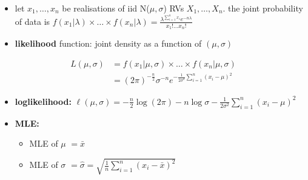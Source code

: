 \documentclass[10pt, landscape]{article}
\newcommand{\xbar}{\bar{x}}
\newcommand{\seq}[2][n]{#2_1, \dots, #2_{#1}}
\begin{document}
\begin{multicols*}{4}
  \begin{itemize}
    \item let $\seq{x}$ be realisations of iid N($\mu, \sigma$) RVs $\seq X$. 
      the joint probability of data is  $f(x_1 \vert \lambda) \times \dots \times f(x_n\vert \lambda) = \frac{\lambda^{\sum^n_{i=1} x_i} e^{-n\lambda}}{x_1! \dots x_n!}$
    \item \textbf{likelihood} function: joint density as a function of $(\mu, \sigma)$
  \end{itemize}
  \begin{align*}
    L(\mu, \sigma) &= f(x_1 \vert \mu,\sigma) \times \dots \times f(x_n \vert \mu, \sigma) \\
                   &= (2\pi)^{-\frac{n}{2}} \sigma^{-n} e^{-\frac{1}{2\sigma^2}\sum^n_{i=1}(x_i - \mu)^2}
  \end{align*}

  \begin{itemize}
    \item \textbf{loglikelihood:}
      $\ell(\mu,\sigma) = -\frac{n}{2} \log(2\pi) - n\log\sigma - \frac{1}{2\sigma^2} \sum^n_{i=1}(x_i - \mu)^2$
    \item \textbf{MLE:}
      \begin{itemize}
        \item MLE of $\mu$ $= \xbar$
        \item MLE of $\sigma$ $= \hat \sigma = \sqrt{ \frac{1}{n} \sum^n_{i=1} (x_i - \xbar)^2 }$
      \end{itemize}
  \end{itemize}








\end{multicols*}
\end{document}
